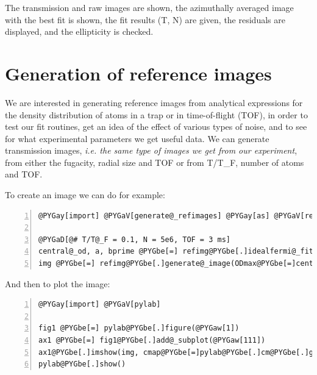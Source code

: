 \documentclass[letterpaper,10pt,english]{manual}
\begin{document}
The transmission and raw images are shown, the azimuthally averaged image with the best fit is shown, the fit results (T, N) are given, the residuals are displayed, and the ellipticity is checked.

\resetcurrentobjects
{}

\hypertarget{module-refimages}{}\section{Generation of reference images}

We are interested in generating reference images from analytical expressions for the density distribution of atoms in a trap or in time-of-flight (TOF), in order to test our fit routines, get an idea of the effect of various types of noise, and to see for what experimental parameters we get useful data. We can generate transmission images, \emph{i.e. the same type of images we get from our experiment}, from either the fugacity, radial size and TOF or from T/T\_F, number of atoms and TOF.

To create an image we can do for example:

\begin{Verbatim}[commandchars=@\[\],numbers=left,firstnumber=1,stepnumber=1]
@PYGay[import] @PYGaV[generate@_refimages] @PYGay[as] @PYGaV[refimg]

@PYGaD[@# T/T@_F = 0.1, N = 5e6, TOF = 3 ms]
central@_od, a, bprime @PYGbe[=] refimg@PYGbe[.]idealfermi@_fitparams(@PYGaw[0.1], @PYGaw[5e6], tof@PYGbe[=]@PYGaw[3e-3])
img @PYGbe[=] refimg@PYGbe[.]generate@_image(ODmax@PYGbe[=]central@_od, fugacity@PYGbe[=]a, cloudradius@PYGbe[=]bprime)
\end{Verbatim}

And then to plot the image:

\begin{Verbatim}[commandchars=@\[\],numbers=left,firstnumber=1,stepnumber=1]
@PYGay[import] @PYGaV[pylab]

fig1 @PYGbe[=] pylab@PYGbe[.]figure(@PYGaw[1])
ax1 @PYGbe[=] fig1@PYGbe[.]add@_subplot(@PYGaw[111])
ax1@PYGbe[.]imshow(img, cmap@PYGbe[=]pylab@PYGbe[.]cm@PYGbe[.]gray, vmin@PYGbe[=]@PYGaw[0], vmax@PYGbe[=]@PYGaw[1.35])
pylab@PYGbe[.]show()
\end{Verbatim}
\end{document}
